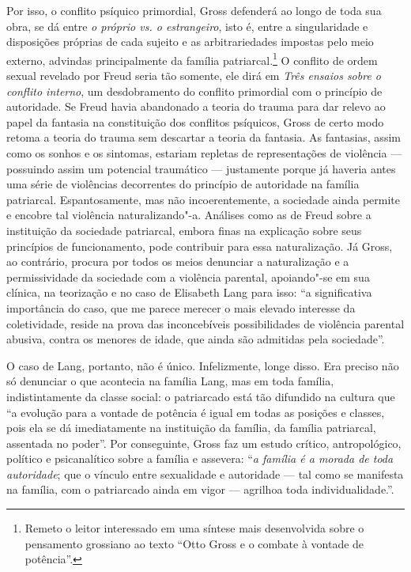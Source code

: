 Por isso, o conflito psíquico primordial, Gross defenderá ao longo de
toda sua obra, se dá entre \emph{o próprio vs. o estrangeiro}, isto é,
entre a singularidade e disposições próprias de cada sujeito e as
arbitrariedades impostas pelo meio externo, advindas principalmente da
família patriarcal.\footnote{Remeto o leitor interessado em uma síntese
  mais desenvolvida sobre o pensamento grossiano ao texto ``Otto Gross e
  o combate à vontade de potência''.} O conflito de ordem sexual
revelado por Freud seria tão somente, ele dirá em \emph{Três ensaios
sobre o conflito interno}, um desdobramento do conflito primordial com
o princípio de autoridade. Se Freud havia abandonado a teoria do trauma
para dar relevo ao papel da fantasia na constituição dos conflitos
psíquicos, Gross de certo modo retoma a teoria do trauma sem descartar a
teoria da fantasia. As fantasias, assim como os sonhos e os sintomas,
estariam repletas de representações de violência --- possuindo assim um
potencial traumático --- justamente porque já haveria antes uma série de
violências decorrentes do princípio de autoridade na família patriarcal.
Espantosamente, mas não incoerentemente, a sociedade ainda permite e
encobre tal violência naturalizando"-a. Análises como as de Freud sobre a
instituição da sociedade patriarcal, embora finas na explicação sobre
seus princípios de funcionamento, pode contribuir para essa
naturalização. Já Gross, ao contrário, procura por todos os meios
denunciar a naturalização e a permissividade da sociedade com a
violência parental, apoiando"-se em sua clínica, na teorização e no caso
de Elisabeth Lang para isso: ``a significativa importância do caso, que
me parece merecer o mais elevado interesse da coletividade, reside na
prova das inconcebíveis possibilidades de violência parental abusiva,
contra os menores de idade, que ainda são admitidas pela sociedade''.

O caso de Lang, portanto, não é único. Infelizmente, longe disso. Era
preciso não só denunciar o que acontecia na família Lang, mas em toda
família, indistintamente da classe social: o patriarcado está tão
difundido na cultura que ``a evolução para a vontade de potência é igual
em todas as posições e classes, pois ela se dá imediatamente na
instituição da família, da família patriarcal, assentada no poder''.
Por conseguinte, Gross faz um estudo crítico, antropológico, político e
psicanalítico sobre a família e assevera: ``\emph{a família é a morada
de toda autoridade}; que o vínculo entre sexualidade e autoridade ---
tal como se manifesta na família, com o patriarcado ainda em vigor ---
agrilhoa toda individualidade.''.

